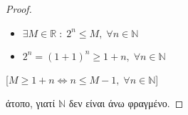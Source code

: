 \begin{enumerate}
\begin{proof}
      \begin{minipage}{0.35\textwidth}
        \begin{itemize}
          \item $ \exists M \in \mathbb{R} \; : \; 2^{n} \leq M, \; 
            \forall n \in \mathbb{N} $ \hfill {}
          \item $ 2^{n}=(1+1)^{n} \geq 1+n, \; \forall n \in 
            \mathbb{N} $ \hfill {}
        \end{itemize}    
      \end{minipage}
      [$ M \geq 1+n \Leftrightarrow n \leq M-1, \; 
      \forall n \in \mathbb{N} $] 

      άτοπο, γιατί $ \mathbb{N} $ δεν είναι άνω φραγμένο.
    \end{proof}






\end{enumerate}
